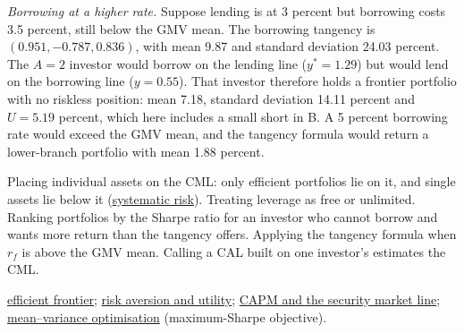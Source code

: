 \begin{qfmethod}
\emph{Borrowing at a higher rate.} Suppose lending is at 3 percent but borrowing costs 3.5 percent, still below the GMV mean. The borrowing tangency is $(0.951,-0.787,0.836)$, with mean 9.87 and standard deviation 24.03 percent. The $A=2$ investor would borrow on the lending line ($y^\ast=1.29$) but would lend on the borrowing line ($y=0.55$). That investor therefore holds a frontier portfolio with no riskless position: mean 7.18, standard deviation 14.11 percent and $U=5.19$ percent, which here includes a small short in B. A 5 percent borrowing rate would exceed the GMV mean, and the tangency formula would return a lower-branch portfolio with mean 1.88 percent.

 Placing individual assets on the CML: only efficient portfolios lie on it, and single assets lie below it (\hyperref[mech:systematic-risk-pricing]{systematic risk}). Treating leverage as free or unlimited. Ranking portfolios by the Sharpe ratio for an investor who cannot borrow and wants more return than the tangency offers. Applying the tangency formula when $r_f$ is above the GMV mean. Calling a CAL built on one investor's estimates the CML.

 \hyperref[meth:efficient-frontier]{efficient frontier}; \hyperref[def:risk-aversion-utility]{risk aversion and utility}; \hyperref[mod:capm-sml]{CAPM and the security market line}; \hyperref[mod:mean-variance-portfolio-optimisation]{mean--variance optimisation} (maximum-Sharpe objective).

\end{qfmethod}
